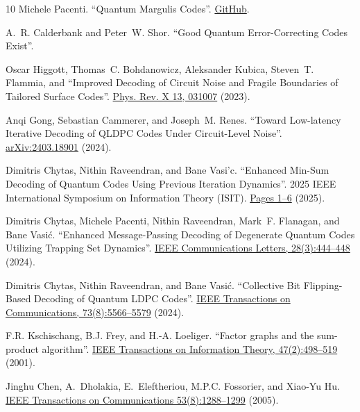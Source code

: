 \documentclass[a4paper,twocolumn,11pt,accepted=2026-05-03]{quantumarticle}
\begin{document}
\begin{thebibliography}{10}
 Michele Pacenti. ``Quantum Margulis Codes''. \href{https://github.com/Error-Correction-Lab/quantumMargulisCodes}{GitHub}.

 A.~R. Calderbank and Peter~W. Shor.
 ``Good Quantum Error-Correcting Codes Exist''.%

 Oscar Higgott, Thomas~C. Bohdanowicz, Aleksander Kubica, Steven~T. Flammia, and%
 ``Improved {Decoding} of {Circuit} {Noise} and {Fragile} {Boundaries}
   of {Tailored} {Surface} {Codes}''.
 \href{https://doi.org/10.1103/PhysRevX.13.031007}{Phys. Rev. X 13, 031007} (2023).

 Anqi Gong, Sebastian Cammerer, and Joseph~M. Renes.
 ``Toward Low-latency Iterative Decoding of QLDPC Codes Under
Circuit-Level Noise''. \href{https://arxiv.org/abs/2403.18901}{arXiv:2403.18901} (2024).

Dimitris Chytas, Nithin Raveendran, and Bane Vasi'c.
 ``Enhanced Min-Sum Decoding of Quantum Codes Using Previous Iteration  Dynamics''. 2025 IEEE International Symposium on Information Theory (ISIT). \href{https://doi.org/10.1109/ISIT63088.2025.11195509}{Pages 1--6} (2025).

 Dimitris Chytas, Michele Pacenti, Nithin Raveendran, Mark~F. Flanagan, and Bane Vasić. ``Enhanced {Message}-{Passing} {Decoding} of {Degenerate} {Quantum}
   {Codes} {Utilizing} {Trapping} {Set} {Dynamics}''. \href{https://doi.org/10.1109/LCOMM.2024.3356312}{IEEE Communications Letters, 28(3):444--448} (2024).

 Dimitris Chytas, Nithin Raveendran, and Bane Vasić.
 ``Collective Bit Flipping-Based Decoding of Quantum {LDPC} Codes''. \href{https://doi.org/10.1109/TCOMM.2025.3535897}{IEEE Transactions on Communications, 73(8):5566--5579} (2024).

 F.R. Kschischang, B.J. Frey, and H.-A. Loeliger. ``Factor graphs and the sum-product algorithm''. \href{https://doi.org/10.1109/18.910572}{IEEE Transactions on Information Theory, 47(2):498--519} (2001).

Jinghu Chen, A.~Dholakia, E.~Eleftheriou, M.P.C. Fossorier, and Xiao-Yu Hu.%
 \href{https://doi.org/10.1109/TCOMM.2005.852852}{IEEE Transactions on Communications 53(8):1288--1299} (2005).


\end{thebibliography}
\end{document}
